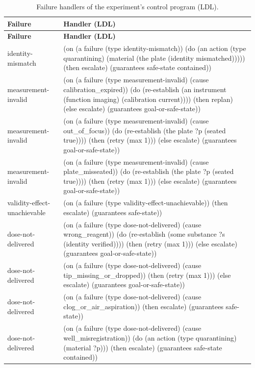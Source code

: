 \documentclass[10pt,a4paper]{article}
\begin{document}
{\footnotesize
\begin{xltabular}{\linewidth}{lX}
\caption{Failure handlers of the experiment's control program (LDL).}\label{tab:handlers}\\
\toprule
\textbf{Failure} & \textbf{Handler (LDL)} \\\midrule
\endfirsthead
\toprule
\textbf{Failure} & \textbf{Handler (LDL)} \\\midrule
\endhead
\bottomrule
\endlastfoot
identity-mismatch & (on (a failure (type identity-mismatch)) (do (an action (type quarantining) (material (the plate (identity mismatched))))) (then escalate) (guarantees safe-state contained)) \\
measurement-invalid & (on (a failure (type measurement-invalid) (cause calibration\_\allowbreak{}expired)) (do (re-establish (an instrument (function imaging) (calibration current)))) (then replan) (else escalate) (guarantees goal-or-safe-state)) \\
measurement-invalid & (on (a failure (type measurement-invalid) (cause out\_\allowbreak{}of\_\allowbreak{}focus)) (do (re-establish (the plate ?p (seated true)))) (then (retry (max 1))) (else escalate) (guarantees goal-or-safe-state)) \\
measurement-invalid & (on (a failure (type measurement-invalid) (cause plate\_\allowbreak{}misseated)) (do (re-establish (the plate ?p (seated true)))) (then (retry (max 1))) (else escalate) (guarantees goal-or-safe-state)) \\
validity-effect-unachievable & (on (a failure (type validity-effect-unachievable)) (then escalate) (guarantees safe-state)) \\
dose-not-delivered & (on (a failure (type dose-not-delivered) (cause wrong\_\allowbreak{}reagent)) (do (re-establish (some substance ?s (identity verified)))) (then (retry (max 1))) (else escalate) (guarantees goal-or-safe-state)) \\
dose-not-delivered & (on (a failure (type dose-not-delivered) (cause tip\_\allowbreak{}missing\_\allowbreak{}or\_\allowbreak{}dropped)) (then (retry (max 1))) (else escalate) (guarantees goal-or-safe-state)) \\
dose-not-delivered & (on (a failure (type dose-not-delivered) (cause clog\_\allowbreak{}or\_\allowbreak{}air\_\allowbreak{}aspiration)) (then escalate) (guarantees safe-state)) \\
dose-not-delivered & (on (a failure (type dose-not-delivered) (cause well\_\allowbreak{}misregistration)) (do (an action (type quarantining) (material ?p))) (then escalate) (guarantees safe-state contained)) \\

\end{xltabular}}
\end{document}
